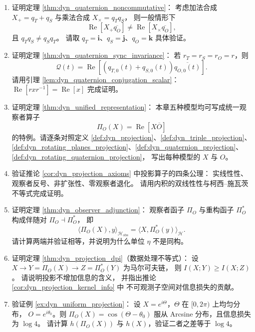 \begin{enumerate}[leftmargin=3em, label=\textbf{题 \arabic*}]
    \item 证明定理 \ref{thm:dyn_quaternion_noncommutative}：
    考虑加法合成 $X_+=q_T+q_S$ 与乘法合成 $X_\times=q_Tq_S$，
    则一般情形下
    \[
    \operatorname{Re}[X_+\overline{q_O}]\neq\operatorname{Re}[X_\times\overline{q_O}],
    \]
    且 $q_Tq_S\neq q_Sq_T$。
    请取 $q_T=\mathbf{i}$、$q_S=\mathbf{j}$、$q_O=\mathbf{k}$ 具体验证。

    \item 证明定理 \ref{thm:dyn_quaternion_sync_invariance}：
    若 $r_T=r_S=r_O=r$，则
    \[
    \mathcal{Q}(t)=\operatorname{Re}[(q_{T,0}(t)+q_{S,0}(t))\overline{q_{O,0}(t)}].
    \]
    请用引理 \ref{lem:dyn_quaternion_conjugation_scalar}：
    $\operatorname{Re}[rxr^{-1}]=\operatorname{Re}[x]$ 完成证明。

    \item 证明定理 \ref{thm:dyn_unified_representation}：
    本章五种模型均可写成统一观察者算子
    \[
    \Pi_O(X)=\operatorname{Re}[X\overline{O}]
    \]
    的特例。请逐条对照定义 \ref{def:dyn_projection}、\ref{def:dyn_triple_projection}、
    \ref{def:dyn_rotating_planes_projection}、\ref{def:dyn_quaternion_projection}、
    \ref{def:dyn_rotating_quaternion_projection}，
    写出每种模型的 $X$ 与 $O$。

    \item 验证推论 \ref{cor:dyn_projection_axioms} 中投影算子的四条公理：
    实线性性、观察者反号、非扩张性、零观察者退化。
    请用内积的双线性性与柯西--施瓦茨不等式完成证明。

    \item 证明定理 \ref{thm:dyn_observer_adjunction}：
    观察者函子 $\Pi_O$ 与重构函子 $\Pi_O^\ast$ 构成伴随对
    $\Pi_O\dashv\Pi_O^\ast$，
    即
    \[
    \langle\Pi_O(X),y\rangle_{\mathcal{H}_{\text{obs}}}
    =\langle X,\Pi_O^\ast(y)\rangle_{\mathcal{H}}.
    \]
    请计算两端并验证相等，并说明为什么单位 $\eta$ 不是同构。

    \item 证明定理 \ref{thm:dyn_projection_dpi}（数据处理不等式）：
    设 $X\to Y=\Pi_O(X)\to Z=\Pi_O^\ast(Y)$ 为马尔可夫链，
    则 $I(X;Y)\ge I(X;Z)$。
    请说明投影不增加信息的含义，
    并指出推论 \ref{cor:dyn_projection_kernel_info} 中
    不可观测子空间对信息损失的贡献。

    \item 验证例 \ref{ex:dyn_uniform_projection}：
    设 $X=e^{i\Theta}$，$\Theta$ 在 $[0,2\pi)$ 上均匀分布，
    $O=e^{i\theta_0}$。则 $\Pi_O(X)=\cos(\Theta-\theta_0)$
    服从 Arcsine 分布，且信息损失为 $\log 4$。
    请计算 $h(\Pi_O(X))$ 与 $h(X)$，验证二者之差等于 $\log 4$。


\end{enumerate}
